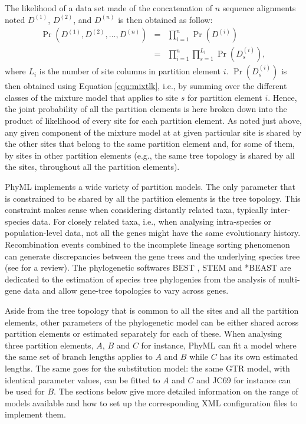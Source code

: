 \documentclass[a4paper,12pt]{article}
\begin{document}
The likelihood of a  data set made of the concatenation of $n$  sequence alignments noted $D^{(1)}$,
$D^{(2)}$, and $D^{(n)}$ is then obtained as follow:
\begin{eqnarray}
\Pr(D^{(1)},D^{(2)},\ldots,D^{(n)}) &=& \prod_{i=1}^{n}  \Pr(D^{(i)}) \nonumber\\
&=& \prod_{i=1}^{n}  \prod_{s=1}^{L_i} \Pr(D^{(i)}_s),
\end{eqnarray} where $L_i$ is the number of site columns in partition element $i$.  $\Pr(D^{(i)}_s)$
is then obtained using Equation \ref{equ:mixtlk}, i.e., by summing over the different classes of the
mixture model that  applies to site $s$ for  partition element $i$. Hence, the  joint probability of
all the partition elements is here broken down into the product of likelihood of every site for each
partition  element. As  noted just  above, any  given component  of the  mixture model  at at  given
particular site is shared by the other sites that belong to the same partition element and, for some
of them, by  sites in other partition  elements (e.g., the same  tree topology is shared  by all the
sites, throughout all the partition elements).

PhyML implements a wide  variety of partition models.  The only parameter that  is constrained to be
shared  by all  the  partition elements  is  the tree  topology. This  constraint  makes sense  when
considering distantly  related taxa, typically inter-species  data. For closely related  taxa, i.e.,
when  analysing intra-species  or population-level  data,  not all  the  genes might  have the  same
evolutionary history.   Recombination events combined  to the incomplete lineage  sorting phenomenon
can  generate  discrepancies   between  the  gene  trees  and  the   underlying  species  tree  (see
\cite{degnan09}  for  a review).   The  phylogenetic  softwares BEST  \cite{best},  STEM
\cite{stem} and  *BEAST \cite{startbeast} are dedicated  to the estimation
of species tree phylogenies  from the analysis of multi-gene data and  allow gene-tree topologies to
vary across genes.

Aside from the tree topology  that is common to all the sites and  all the partition elements, other
parameters of  the phylogenetic model  can be either shared  across partition elements  or estimated
separately  for each  of  these. When  analysing  three partition  elements, $A$,  $B$  and $C$  for
instance, PhyML can  fit a model where the same  set of branch lengths applies to  $A$ and $B$ while
$C$ has its  own estimated lengths.  The same  goes for the substitution model: the  same GTR model,
with identical parameter values, can be fitted to $A$  and $C$ and JC69 for instance can be used for
$B$. The sections below  give more detailed information on the range of  models available and how to
set up the corresponding XML configuration files to implement them.
\end{document}

